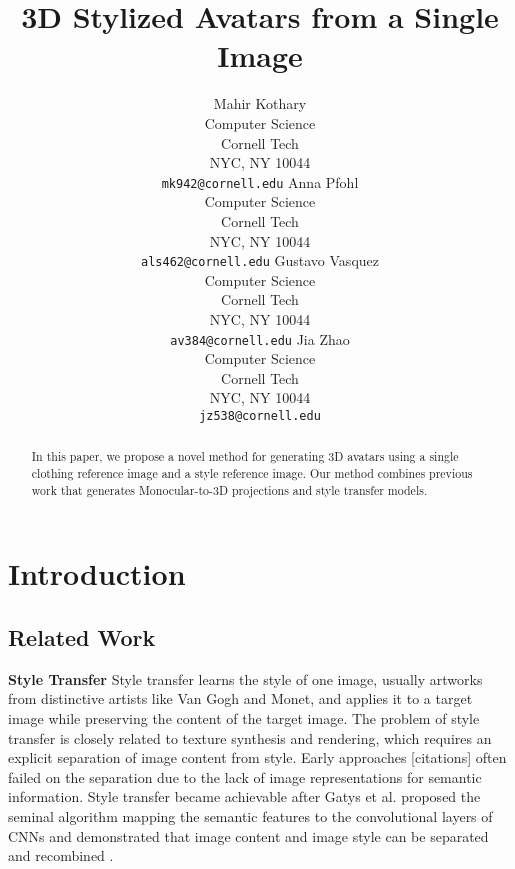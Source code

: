 \documentclass{article}
\title{3D Stylized Avatars from a Single Image}
\author{%
  Mahir Kothary\\
  Computer Science\\
  Cornell Tech\\
  NYC, NY 10044 \\
  \texttt{mk942@cornell.edu} 
 \And Anna Pfohl\\
  Computer Science\\
  Cornell Tech\\
  NYC, NY 10044 \\
  \texttt{als462@cornell.edu}
\AND
  Gustavo Vasquez \\
  Computer Science\\
  Cornell Tech\\
  NYC, NY 10044 \\
  \texttt{av384@cornell.edu}
\And
  Jia Zhao \\
  Computer Science\\
  Cornell Tech\\
  NYC, NY 10044 \\
  \texttt{jz538@cornell.edu}
}
\begin{document}
\maketitle

\begin{abstract}
In this paper, we propose a novel method for generating 3D avatars using a single clothing reference image and a style reference image. Our method combines previous work that generates Monocular-to-3D projections and style transfer models.
\end{abstract}


\section{Introduction}




\subsection{Related Work}

\textbf{Style Transfer} Style transfer learns the style of one image, usually artworks from distinctive artists like Van Gogh and Monet, and applies it to a target image while preserving the content of the target image. The problem of style transfer is closely related to texture synthesis and rendering, which requires an explicit separation of image content from style. Early approaches [citations] often failed on the separation due to the lack of image representations for semantic information. Style transfer became achievable after Gatys et al. proposed the seminal algorithm mapping the semantic features to the convolutional layers of CNNs and demonstrated that image content and image style can be separated and recombined \cite{gatys2016styleTransfer}. 
\end{document}
